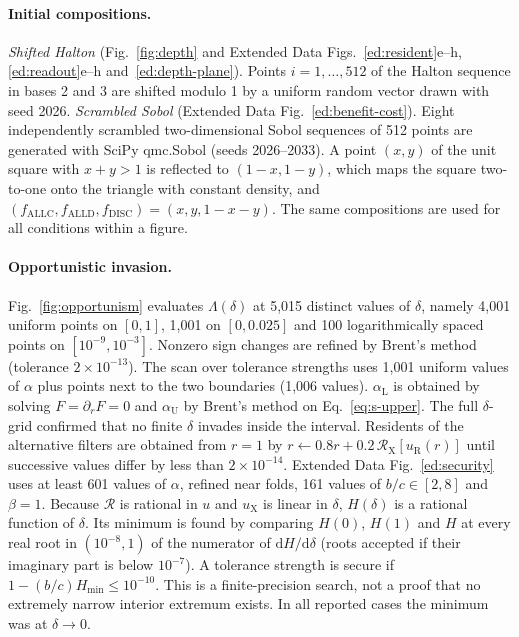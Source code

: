 \documentclass[fleqn,10pt]{wlscirep}
\newcommand{\Rmap}{\mathscr{R}}            %
\newcommand{\uX}{u_{\mathrm{X}}}
\newcommand{\Hmin}{H_{\min}}
\newcommand{\dd}{\mathrm{d}}
\newcommand{\ALLC}{\mathrm{ALLC}}
\newcommand{\ALLD}{\mathrm{ALLD}}
\newcommand{\DISC}{\mathrm{DISC}}
\theoremstyle{plain}
\begin{document}
\paragraph{Initial compositions.} \textit{Shifted Halton} (Fig.~\ref{fig:depth} and Extended Data Figs.~\ref{ed:resident}e--h, \ref{ed:readout}e--h and~\ref{ed:depth-plane}). Points $i=1,\ldots,512$ of the Halton sequence in bases 2 and 3 are shifted modulo 1 by a uniform random vector drawn with seed 2026. \textit{Scrambled Sobol} (Extended Data Fig.~\ref{ed:benefit-cost}). Eight independently scrambled two-dimensional Sobol sequences of 512 points are generated with SciPy qmc.Sobol (seeds 2026--2033). A point $(x,y)$ of the unit square with $x+y>1$ is reflected to $(1-x,1-y)$, which maps the square two-to-one onto the triangle with constant density, and $(f_{\ALLC},f_{\ALLD},f_{\DISC})=(x,y,1-x-y)$. The same compositions are used for all conditions within a figure.

\paragraph{Opportunistic invasion.} Fig.~\ref{fig:opportunism} evaluates $\Lambda(\delta)$ at 5,015 distinct values of $\delta$, namely 4,001 uniform points on $[0,1]$, 1,001 on $[0,0.025]$ and 100 logarithmically spaced points on $[10^{-9},10^{-3}]$. Nonzero sign changes are refined by Brent's method (tolerance $2\times10^{-13}$). The scan over tolerance strengths uses 1,001 uniform values of $\alpha$ plus points next to the two boundaries (1,006 values). $\alpha_{\mathrm L}$ is obtained by solving $F=\partial_rF=0$ and $\alpha_{\mathrm U}$ by Brent's method on Eq.~\eqref{eq:s-upper}. The full $\delta$-grid confirmed that no finite $\delta$ invades inside the interval. Residents of the alternative filters are obtained from $r=1$ by $r\leftarrow0.8r+0.2\,\Rmap_{\mathrm X}[u_{\mathrm R}(r)]$ until successive values differ by less than $2\times10^{-14}$. Extended Data Fig.~\ref{ed:security} uses at least 601 values of $\alpha$, refined near folds, 161 values of $b/c\in[2,8]$ and $\beta=1$. Because $\Rmap$ is rational in $u$ and $\uX$ is linear in $\delta$, $H(\delta)$ is a rational function of $\delta$. Its minimum is found by comparing $H(0)$, $H(1)$ and $H$ at every real root in $(10^{-8},1)$ of the numerator of $\dd H/\dd\delta$ (roots accepted if their imaginary part is below $10^{-7}$). A tolerance strength is secure if $1-(b/c)\Hmin\leq10^{-10}$. This is a finite-precision search, not a proof that no extremely narrow interior extremum exists. In all reported cases the minimum was at $\delta\to0$.
\end{document}
